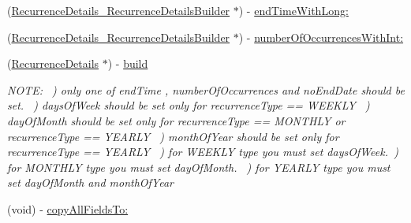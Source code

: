 \begin{DoxyCompactItemize}
(\hyperlink{interface_recurrence_details___recurrence_details_builder}{Recurrence\+Details\+\_\+\+Recurrence\+Details\+Builder} $\ast$) -\/ \hyperlink{interface_recurrence_details___recurrence_details_builder_a56cd6b61a4f13480f90ebeadbe039bbc}{end\+Time\+With\+Long\+:}
\item 
(\hyperlink{interface_recurrence_details___recurrence_details_builder}{Recurrence\+Details\+\_\+\+Recurrence\+Details\+Builder} $\ast$) -\/ \hyperlink{interface_recurrence_details___recurrence_details_builder_add6aeca8938e31cc55142310b67e885b}{number\+Of\+Occurrences\+With\+Int\+:}
\item 
(\hyperlink{interface_recurrence_details}{Recurrence\+Details} $\ast$) -\/ \hyperlink{interface_recurrence_details___recurrence_details_builder_adcdc12bab61acea6027fc65b628892bb}{build}
\begin{DoxyCompactList}\small\item\em N\+O\+T\+E\+: ~) only one of \textquotesingle{}end\+Time\textquotesingle{} , \textquotesingle{}number\+Of\+Occurrences\textquotesingle{} and \textquotesingle{}no\+End\+Date\textquotesingle{} should be set. ~) \textquotesingle{}days\+Of\+Week\textquotesingle{} should be set only for recurrence\+Type == W\+E\+E\+K\+L\+Y ~) \textquotesingle{}day\+Of\+Month\textquotesingle{} should be set only for recurrence\+Type == M\+O\+N\+T\+H\+L\+Y or recurrence\+Type == Y\+E\+A\+R\+L\+Y ~) \textquotesingle{}month\+Of\+Year\textquotesingle{} should be set only for recurrence\+Type == Y\+E\+A\+R\+L\+Y ~) for W\+E\+E\+K\+L\+Y type you must set \textquotesingle{}days\+Of\+Week\textquotesingle{}.~) for M\+O\+N\+T\+H\+L\+Y type you must set \textquotesingle{}day\+Of\+Month\textquotesingle{}. ~) for Y\+E\+A\+R\+L\+Y type you must set \textquotesingle{}day\+Of\+Month\textquotesingle{} and \textquotesingle{}month\+Of\+Year\textquotesingle{} ~\newline
 \end{DoxyCompactList}\item 
(void) -\/ \hyperlink{interface_recurrence_details___recurrence_details_builder_a97145126b3f9917840ff010e76ef0d1c}{copy\+All\+Fields\+To\+:}
\end{DoxyCompactItemize}
